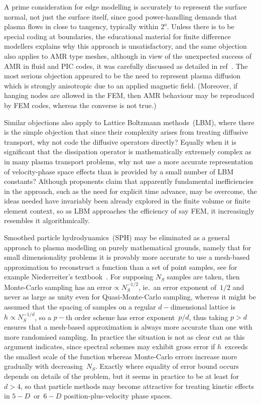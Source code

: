 A prime consideration for edge modelling is accurately to represent the surface
normal, not just the surface itself, since good power-handling demands that
plasma flows in close to tangency, typically within $2^{o}$. Unless there is to be
special coding at boundaries, the educational material for finite difference
modellers explains why this approach is unsatisfactory, and the same objection
also applies to AMR type meshes, although in view of the unexpected success of AMR
in fluid and PIC codes, it was carefully discussed as detailed in ref~\cite{y1re211}. The
most serious objection appeared to be the need to represent plasma diffusion
which is strongly anisotropic due to an applied magnetic field. (Moreover,
if hanging nodes are allowed in the FEM, then AMR behaviour may be reproduced by FEM codes,
whereas the converse is not true.)

Similar objections also apply to Lattice Boltzmann methods~(LBM), where there is the simple
objection that since their complexity arises from treating diffusive transport, why not code
the diffusive operators directly? Equally when it is significant that
the dissipation operator is mathematically extremely complex as
in many plasma transport problems, why not use a more accurate representation of
velocity-phase space effects than is provided by a small number of LBM constants?
Although proponents claim that apparently fundamental inefficiencies in the approach,
such as the need for explicit time advance, may be overcome, the ideas needed have
invariably been already explored in the finite volume or finite element context,
so as LBM approaches the efficiency of say FEM, it increasingly resembles it algorithmically.

Smoothed particle hydrodynamics~(SPH) may be eliminated as a general approach to
plasma modelling on purely mathematical grounds, namely that for small dimensionality
problems it is provably more accurate to use a mesh-based approximation to reconstruct a function
than a set of point samples, see for example Niederreiter's textbook~\cite{niederreiter}.
For supposing $N_S$ samples are taken, then Monte-Carlo sampling has an error$\propto N_S^{-1/2}$,
ie.\ an error exponent of~$1/2$ and  never as large as unity even for Quasi-Monte-Carlo sampling,
whereas it might be assumed that the spacing of samples on a regular $d-$dimensional lattice
is~$h\propto N_S^{-1/d}$, so a $p-$th order scheme has error exponent~$p/d$, thus taking $p>d$
ensures that a mesh-based approximation is always more accurate than one with more
randomised sampling. In practice the situation is not as clear cut as this argument indicates, since
spectral schemes may exhibit gross error if $h$~exceeds the smallest scale of the
function whereas Monte-Carlo errors increase more gradually with decreasing~$N_S$.
Exactly where equality of error bound occurs depends on details of the problem, but it seems in
practice to be at least for $d>4$, so that particle methods may become attractive for
treating kinetic effects in $5-D$~or~$6-D$ position-plus-velocity phase spaces.

